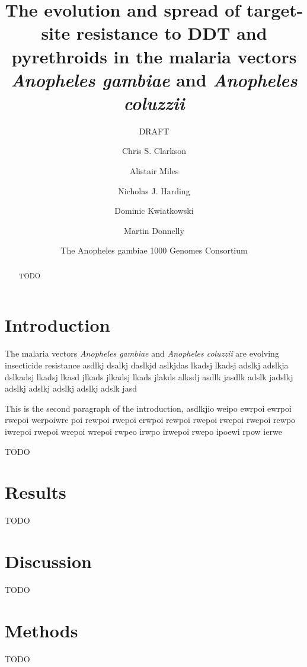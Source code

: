 \documentclass[a4paper,10pt,abstracton]{scrartcl}
\title{The evolution and spread of target-site resistance to DDT and pyrethroids in the malaria vectors \emph{Anopheles gambiae} and \emph{Anopheles coluzzii}}
\subtitle{DRAFT}
\author{
	Chris S. Clarkson
	\and 
	Alistair Miles
	\and
	Nicholas J. Harding
	\and
	Dominic Kwiatkowski
	\and
	Martin Donnelly
	\and
	The Anopheles gambiae 1000 Genomes Consortium
}
\begin{document}
\maketitle

\begin{abstract}

TODO

\end{abstract}

\section*{Introduction}

The malaria vectors \emph{Anopheles gambiae} and \emph{Anopheles coluzzii} are evolving insecticide resistance asdlkj dsalkj daslkjd aslkjdas lkadsj lkadsj adslkj 
adslkja dslkadsj lkadsj lkasd jlkads jlkadsj lkads jlakds alksdj asdlk jasdlk adslk jadslkj adslkj adslkj adslkj adslkj adslk jasd

This is the second paragraph of the introduction, asdlkjio weipo ewrpoi ewrpoi rwepoi werpoiwre poi rewpoi rwepoi erwpoi rewpoi rwepoi rwepoi rwepoi rewpo iwrepoi rwepoi wrepoi 
wrepoi rwpeo irwpo irwepoi rwepo ipoewi rpow ierwe

TODO

\section*{Results}

TODO

\section*{Discussion}

TODO

\section*{Methods}

TODO
\end{document}
